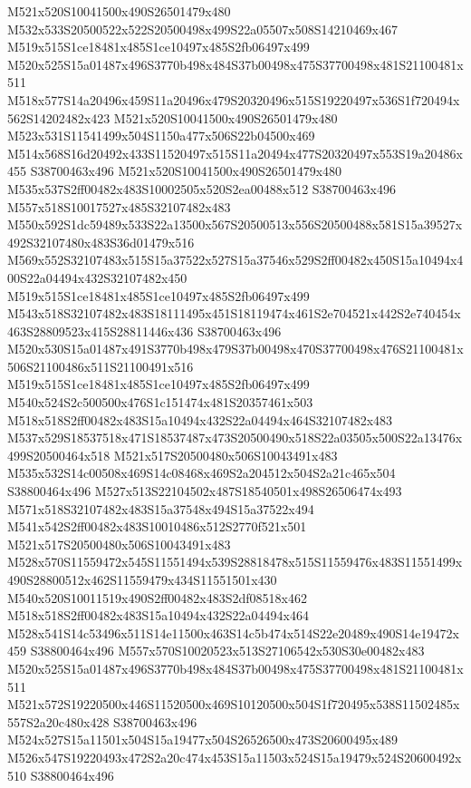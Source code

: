 \documentclass{article}
\begin{document}
\begin{multicols}{2}
M521x520S10041500x490S26501479x480 M532x533S20500522x522S20500498x499S22a05507x508S14210469x467 M519x515S1ce18481x485S1ce10497x485S2fb06497x499 M520x525S15a01487x496S3770b498x484S37b00498x475S37700498x481S21100481x511 M518x577S14a20496x459S11a20496x479S20320496x515S19220497x536S1f720494x562S14202482x423 M521x520S10041500x490S26501479x480 M523x531S11541499x504S1150a477x506S22b04500x469 M514x568S16d20492x433S11520497x515S11a20494x477S20320497x553S19a20486x455 S38700463x496 M521x520S10041500x490S26501479x480 M535x537S2ff00482x483S10002505x520S2ea00488x512 S38700463x496 M557x518S10017527x485S32107482x483 M550x592S1dc59489x533S22a13500x567S20500513x556S20500488x581S15a39527x492S32107480x483S36d01479x516 M569x552S32107483x515S15a37522x527S15a37546x529S2ff00482x450S15a10494x400S22a04494x432S32107482x450 M519x515S1ce18481x485S1ce10497x485S2fb06497x499 M543x518S32107482x483S18111495x451S18119474x461S2e704521x442S2e740454x463S28809523x415S28811446x436 S38700463x496 M520x530S15a01487x491S3770b498x479S37b00498x470S37700498x476S21100481x506S21100486x511S21100491x516 M519x515S1ce18481x485S1ce10497x485S2fb06497x499 M540x524S2c500500x476S1c151474x481S20357461x503 M518x518S2ff00482x483S15a10494x432S22a04494x464S32107482x483 M537x529S18537518x471S18537487x473S20500490x518S22a03505x500S22a13476x499S20500464x518 M521x517S20500480x506S10043491x483 M535x532S14c00508x469S14c08468x469S2a204512x504S2a21c465x504 S38800464x496 M527x513S22104502x487S18540501x498S26506474x493 M571x518S32107482x483S15a37548x494S15a37522x494 M541x542S2ff00482x483S10010486x512S2770f521x501 M521x517S20500480x506S10043491x483 M528x570S11559472x545S11551494x539S28818478x515S11559476x483S11551499x490S28800512x462S11559479x434S11551501x430 M540x520S10011519x490S2ff00482x483S2df08518x462 M518x518S2ff00482x483S15a10494x432S22a04494x464 M528x541S14c53496x511S14e11500x463S14c5b474x514S22e20489x490S14e19472x459 S38800464x496 M557x570S10020523x513S27106542x530S30e00482x483 M520x525S15a01487x496S3770b498x484S37b00498x475S37700498x481S21100481x511 M521x572S19220500x446S11520500x469S10120500x504S1f720495x538S11502485x557S2a20c480x428 S38700463x496 M524x527S15a11501x504S15a19477x504S26526500x473S20600495x489 M526x547S19220493x472S2a20c474x453S15a11503x524S15a19479x524S20600492x510 S38800464x496

\end{multicols}
\end{document}
